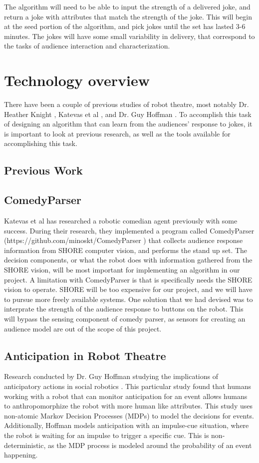 \documentclass[onecolumn, draftclsnofoot,10pt, compsoc]{IEEEtran}
\begin{document}
The algorithm will need to be able to input the strength of a delivered joke, and return a joke with attributes that match the strength of the joke. This will begin at the seed portion of the algorithm, and pick jokes until the set has lasted 3-6 minutes. The jokes will have some small variability in delivery, that correspond to the tasks of audience interaction and characterization.

\section{Technology overview}
    There have been a couple of previous studies of robot theatre, most notably Dr. Heather Knight \cite{KnightEightLessons:2011}, Katevas et al \cite{KatevasRobot:2014}, and Dr. Guy Hoffman \cite{hoffman2010anticipation}. To accomplish this task of designing an algorithm that can learn from the audiences' response to jokes, it is important to look at previous research, as well as the tools available for accomplishing this task.
\subsection{Previous Work}
  \subsection{ComedyParser}
  Katevas et al \cite{KatevasRobot:2014} has researched a robotic comedian agent previously with some success. During their research, they implemented a program called ComedyParser (https://github.com/minoskt/ComedyParser ) that collects audience response information from SHORE computer vision, and performs the stand up set. The decision components, or what the robot does with information gathered from the SHORE vision, will be most important for implementing an algorithm in our project. 
  A limitation with ComedyParser is that is specifically needs the SHORE vision to operate. SHORE will be too expensive for our project, and we will have to pursue more freely available systems. One solution that we had devised was to interprate the strength of the audience response to buttons on the robot. This will bypass the sensing component of comedy parser, as sensors for creating an audience model are out of the scope of this project.

  \subsection{Anticipation in Robot Theatre}
  Research conducted by Dr. Guy Hoffman studying the implications of anticipatory actions in social robotics \cite{hoffman2010anticipation}. This particular study found that humans working with a robot that can monitor anticipation for an event allows humans to anthropomorphize the robot with more human like attributes. This study uses non-atomic Markov Decision Processes (MDPs) to model the decisions for events. Additionally, Hoffman models anticipation with an impulse-cue situation, where the robot is waiting for an impulse to trigger a specific cue. This is non-deterministic, as the MDP process is modeled around the probability of an event happening.
\end{document}
